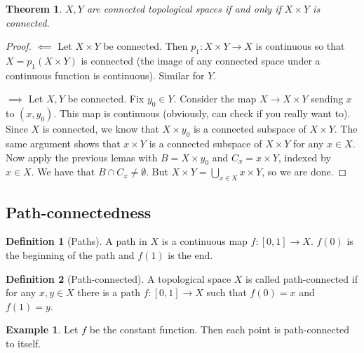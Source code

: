 \documentclass{article}
\theoremstyle{definition}
\newtheorem{defn}{Definition}[section]
\newtheorem{exmp}{Example}[section]
\theoremstyle{plain}%
\newtheorem{thm}{Theorem}[section]
\theoremstyle{remark}
\newcommand{\Union}{\bigcup}
\newcommand{\intersection}{\cap}
\begin{document}
\begin{thm}
    $X, Y$ are connected topological spaces if and only if $X \times Y$ is connected.
\end{thm}

\begin{proof}
    $\impliedby$ Let $X \times Y$ be connected. Then $p_1 : X \times Y \to X$ is continuous so that $X = p_1(X \times Y)$ is connected (the image of any connected space under a continuous function is continuous). Similar for $Y$.
    
    
    $\implies$ Let $X, Y$ be connected. Fix $y_0 \in Y$. Consider the map $X \to X \times Y$ sending $x$ to $(x, y_0)$. This map is continuous (obviously, can check if you really want to). Since $X$ is connected, we know that $X \times y_0$ is a connected subspace of $X \times Y$. The same argument shows that $x \times Y$ is a connected subspace of $X \times Y$ for any $x \in X$. Now apply the previous lemas with $B = X \times y_0$ and $C_x = x \times Y$, indexed by $x \in X$. We have that $B \intersection C_x \ne \emptyset$. But $X \times Y = \Union_{x \in X} x \times Y$, so we are done.
\end{proof}

\subsection{Path-connectedness}

\begin{defn}[Paths]
    A path in $X$ is a continuous map $f: [0,1] \to X$. $f(0)$ is the beginning of the path and $f(1)$ is the end.
\end{defn}

\begin{defn}[Path-connected]
    A topological space $X$ is called path-connected if for any $x,y \in X$ there is a path $f: [0,1] \to X$ such that $f(0) = x$ and $f(1) = y$.
\end{defn}

\begin{exmp}
    Let $f$ be the constant function. Then each point is path-connected to itself.
\end{exmp}
\end{document}
